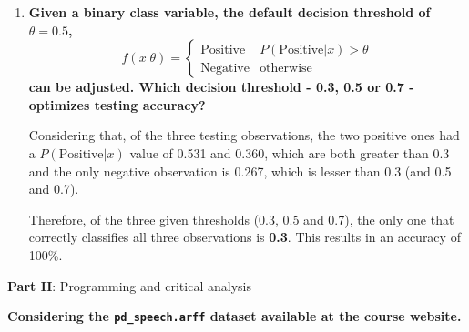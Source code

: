 \documentclass[12pt]{article}
\begin{document}
\begin{enumerate}[leftmargin=\labelsep,resume]
    \item {\bfseries
          Given a binary class variable, the default decision threshold of $\theta = 0.5$,
          $$
              f(x|\theta) = \begin{cases}
                  \text{Positive} & P(\text{Positive}|x) > \theta \\
                  \text{Negative} & \text{otherwise}
              \end{cases}
          $$
          can be adjusted.
          Which decision threshold - 0.3, 0.5 or 0.7 - optimizes testing accuracy?
          }

          Considering that, of the three testing observations,
          the two positive ones had a $P(\text{Positive}|x)$ value
          of 0.531 and 0.360, which are both greater than 0.3
          and the only negative observation is 0.267, which is lesser
          than 0.3 (and 0.5 and 0.7).

          Therefore, of the three given thresholds (0.3, 0.5 and 0.7),
          the only one that correctly classifies all three observations
          is \textbf{0.3}. This results in an accuracy of 100\%.


\end{enumerate}

\pagebreak

\begin{center}
    \large{\textbf{Part II}: Programming and critical analysis}
\end{center}

\textbf{Considering the \texttt{pd\_speech.arff} dataset available at the course website.}
\end{document}
